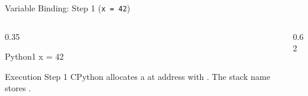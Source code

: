 \begin{frame}[fragile]{Variable Binding: Step 1 (\texttt{x = 42})}
  \begin{columns}[T,onlytextwidth]
    \begin{column}{0.35\textwidth}
      \begin{HighlightedCodeBlock}{Python}{1}
x = 42
      \end{HighlightedCodeBlock}
      \vspace{0.12cm}
      \begin{ConceptBox}{Execution Step 1}
        \scriptsize CPython allocates a  at address  with . The stack name  stores .
      \end{ConceptBox}
    \end{column}
    \begin{column}{0.62\textwidth}
      \centering
    \end{column}
  \end{columns}
  \vspace{0.15cm}
\end{frame}

